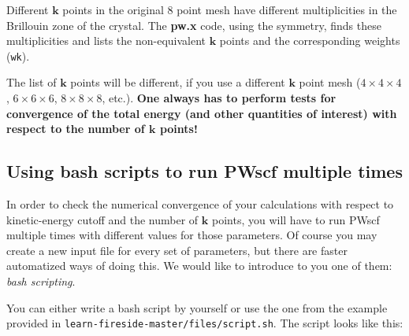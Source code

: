 \documentclass[12pt]{article}
\begin{document}
    Different $\mathbf{k}$ points in the original 8 point mesh have different multiplicities
    in the Brillouin zone of the crystal. The {\bf pw.x} code, using the symmetry, finds these
    multiplicities and lists the non-equivalent $\mathbf{k}$ points and the corresponding
    weights ({\tt wk}). 

    The list of $\mathbf{k}$ points will be different, if you use a different $\mathbf{k}$
    point mesh ($4\times 4 \times 4$, $6\times 6 \times 6$, $8\times 8 \times 8$, etc.). {\bf One always has to
    perform tests for convergence of the total energy (and other quantities of interest)
    with respect to the number of $\mathbf{k}$ points!}

\newpage
\subsection{Using bash scripts to run PWscf multiple times}

    In order to check the numerical convergence of your calculations with respect to
    kinetic-energy cutoff and the number of $\mathbf{k}$ points, you will have to run
    PWscf multiple times with different values for those parameters.
    Of course you may create a new input file for every set of parameters, but there are faster automatized ways of doing this.
    We would like to introduce to you one of them: {\it bash scripting}.

    You can either write a bash script by yourself or use the one from the example provided
    in {\tt learn-fireside-master/files/script.sh}. 
    The script looks like this:
\end{document}
